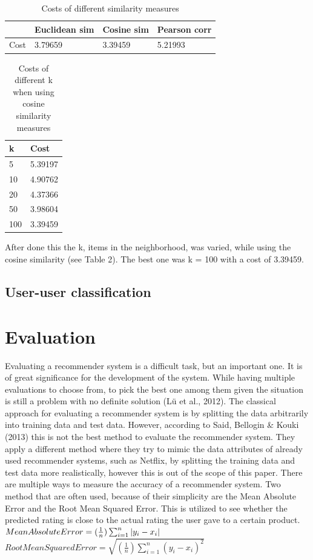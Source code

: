 \documentclass[11pt]{article}
\begin{document}
\newpage

\begin{table}[]
\begin{tabular}{@{}|l|l|l|l|@{}}
\toprule
     & Euclidean sim & Cosine sim & Pearson corr \\ \midrule
Cost & 3.79659              & 3.39459           & 5.21993             \\ \bottomrule
\end{tabular}
\caption{Costs of different similarity measures}
\end{table}


\begin{table}[]
\begin{tabular}{@{}ll@{}}
\toprule
k   & Cost    \\ \midrule
5   & 5.39197 \\
10  & 4.90762 \\
20  & 4.37366 \\
50  & 3.98604 \\
100 & 3.39459 \\ \bottomrule
\end{tabular}
\caption{Costs of different k when using cosine similarity measures}
\end{table}

After done this the k, items in the neighborhood, was varied, while using the cosine similarity (see Table 2). The best one was k = 100 with a cost of 3.39459.

\subsection{User-user classification}
\section{Evaluation}
Evaluating a recommender system is a difficult task, but an important one. It is of great significance for the development of the system. While having multiple evaluations to choose from, to pick the best one among them given the situation is still a problem with no definite solution (Lü et al., 2012).  The classical approach for evaluating a recommender system is by splitting the data arbitrarily into training data and test data. However, according to Said, Bellogin & Kouki (2013) this is not the best method to evaluate the recommender system. They apply a different method where they try to mimic the data attributes of already used recommender systems, such as Netflix, by splitting the training data and test data more realistically, however this is out of the scope of this paper. There are multiple ways to measure the accuracy of a recommender system. Two method that are often used, because of their simplicity are the Mean Absolute Error and the Root Mean Squared Error. This is utilized to see whether the predicted rating is close to the actual rating the user gave to a certain product. \\
\m
$Mean Absolute Error =  (\frac{1}{n})\sum_{i=1}^{n}\left | y_{i} - x_{i} \right |\\
$$Root Mean Squared Error = \sqrt{(\frac{1}{n})\sum_{i=1}^{n}(y_{i} - x_{i})^{2}} $
\end{document}
